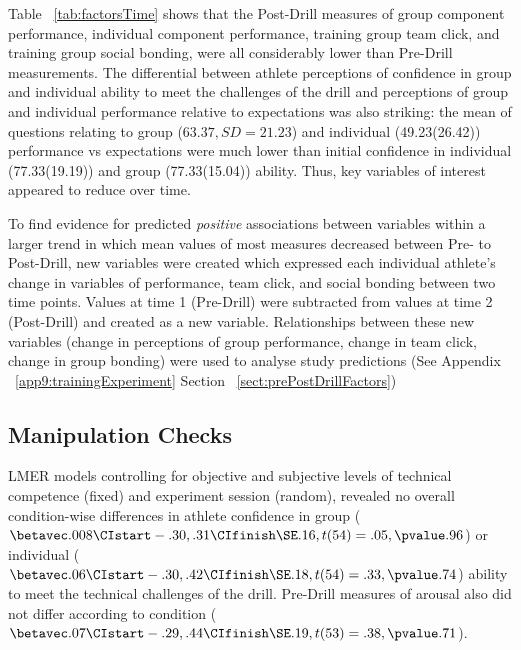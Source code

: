 
Table ~\ref{tab:factorsTime} shows that the Post-Drill measures of group component performance, individual component performance, training group team click, and training group social bonding, were all considerably lower than Pre-Drill measurements. The differential between athlete perceptions of confidence in group and individual ability to meet the challenges of the drill and perceptions of group and individual performance relative to expectations was also striking: the mean of questions relating to group ($63.37, SD = 21.23$) and individual (49.23(26.42)) performance vs expectations were much lower than initial confidence in individual (77.33(19.19)) and group (77.33(15.04)) ability.  Thus, key variables of interest appeared to reduce over time.





To find evidence for predicted \textit{positive} associations between variables within a larger trend in which mean values of most measures decreased between Pre- to Post-Drill, new variables were created which expressed each individual athlete's change in variables of performance, team click, and social bonding between two time points.  Values at time 1 (Pre-Drill) were subtracted from values at time 2 (Post-Drill) and created as a new variable.  Relationships between these new variables (change in perceptions of group performance, change in team click, change in group bonding) were used to analyse study predictions (See Appendix ~\ref{app9:trainingExperiment} Section ~\ref{sect:prePostDrillFactors})







\subsection{Manipulation Checks}

LMER models controlling for objective and subjective levels of technical competence (fixed) and experiment session (random), revealed no overall condition-wise differences in athlete confidence in group ($\betavec .008 \CIstart -.30, .31 \CIfinish \SE .16, t(54)= .05, \pvalue .96$) or individual ($\betavec .06 \CIstart -.30, .42 \CIfinish \SE .18, t(54)= .33, \pvalue .74$) ability to meet the technical challenges of the drill.  Pre-Drill measures of arousal also did not differ according to condition ($\betavec .07 \CIstart -.29, .44 \CIfinish \SE .19, t(53)= .38, \pvalue .71$).

